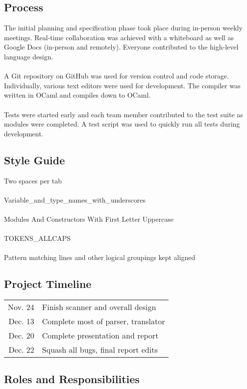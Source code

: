 
\subsection{Process}

The initial planning and specification phase took place during in-person weekly meetings. Real-time collaboration was achieved with a whiteboard as well as Google Docs (in-person and remotely). Everyone contributed to the high-level language design.\\\\
A Git repository on GitHub was used for version control and code storage. Individually, various text editors were used for development. The compiler was written in OCaml and compiles down to OCaml.\\\\
Tests were started early and each team member contributed to the test suite as modules were completed. A test script was used to quickly run all tests during development.

\subsection{Style Guide}

Two spaces per tab\\\\
Variable\_and\_type\_names\_with\_underscores\\\\
Modules And Constructors With First Letter Uppercase\\\\
TOKENS\_ALLCAPS\\\\
Pattern matching lines and other logical groupings kept aligned

\subsection{Project Timeline}

\begin{tabular}{r l}
Nov. 24 & Finish scanner and overall design\\
Dec. 13 & Complete most of parser, translator\\
Dec. 20 & Complete presentation and report\\
Dec. 22 & Squash all bugs, final report edits\\
\end{tabular}

\subsection{Roles and Responsibilities}

